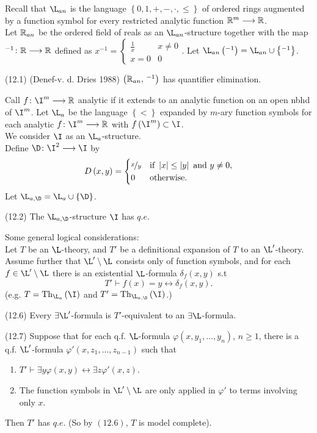 Recall that $\L_{an}$ is the language $\left\{ 0,1,+,-,\cdot,\leq\right\} $
of ordered rings augmented by a function symbol for every restricted
analytic function $\mathbb{R}^{m}\longrightarrow\mathbb{R}$. \\
Let $\mathbb{R}_{an}$ be the ordered field of reals as an $\L_{an}$-structure
together with the map $^{-1}\colon\mathbb{R}\longrightarrow\mathbb{R}$ defined as $x^{-1}=\begin{cases}
\frac{1}{x} & x\neq0\\
x=0 & 0
\end{cases}$. Let $\L_{an}\left(^{-1}\right)=\L_{an}\cup\left\{ ^{-1}\right\} $.
\begin{thm*}
(12.1) (Denef-v. d. Dries 1988) $\left(\mathbb{R}_{an},\,^{-1}\right)$ has
quantifier elimination.
\end{thm*}
Call $f\colon\I^{m}\lto\R$ analytic if it extends to an analytic
function on an open nbhd of $\I^{m}$. Let $\L_{a}$ be the language
$\left\{ <\right\} $ expanded by $m$-ary function symbols for each
analytic $f\colon\I^{m}\lto\R$ with $f\left(\I^{m}\right)\subset\I$.\\
We consider $\I$ as an $\L_{a}$-structure.\\
Define $\D\colon\I^{2}\lto\I$ by
\[
D\left(x,y\right)=\begin{cases}
\nicefrac{x}{y} & \textrm{if }\left|x\right|\leq\left|y\right|\textrm{ and }y\neq0,\\
0 & \textrm{otherwise.}
\end{cases}
\]
Let $\L_{a,\D}=\L_{a}\cup\left\{ \D\right\} $.
\begin{thm*}
(12.2) The $\L_{a,\D}$-structure $\I$ has $q.e.$
\end{thm*}
Some general logical considerations:\\
Let $T$ be an $\L$-theory, and $T'$ be a definitional expansion
of $T$ to an $\L'$-theory. Assume further that $\L'\setminus\L$
consists only of function symbols, and for each $f\in\L'\setminus\L$
there is an existential $\L$-formula $\delta_{f}\left(x,y\right)$
s.t 
\[
T'\vdash f\left(x\right)=y\longleftrightarrow\delta_{f}\left(x,y\right).
\]
(e.g. $T=\mathrm{Th}_{\L_{a}}\left(\I\right)$ and $T'=\mathrm{Th}_{\L_{a,\D}}\left(\I\right)$.)
\begin{lem*}
(12.6) Every $\exists\L'$-formula is $T'$-equivalent to an $\exists\L$-formula.
\begin{lem*}
(12.7) Suppose that for each q.f. $\L$-formula $\varphi\left(x,y_{1},...,y_{n}\right)$,
$n\geq1$, there is a q.f. $\L'$-formula $\varphi'$$\left(x,z_{1},...,z_{n-1}\right)$
such that 
\begin{enumerate}
\item $T'\vdash\exists y\varphi\left(x,y\right)\longleftrightarrow\exists z\varphi'\left(x,z\right)$.
\item The function symbols in $\L'\setminus\L$ are only applied in $\varphi'$
to terms involving only $x$.
\end{enumerate}
\end{lem*}
Then $T'$ has $q.e$. (So by $\left(12.6\right)$, $T$ is model
complete).
\end{lem*}
